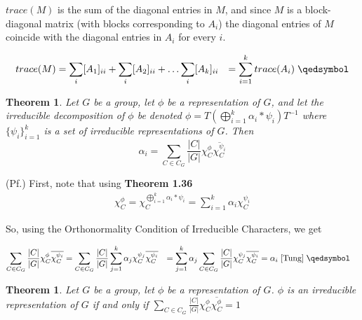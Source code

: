 \documentclass[10pt]{ucthesis}
\newtheorem{theorem}[definition]{Theorem}
\begin{document}
$trace(M)$ is the sum of the diagonal entries in $M$, and since $M$ is a block-diagonal matrix (with blocks corresponding to $A_i$) the diagonal entries of $M$ coincide with the diagonal entries in $A_i$ for every $i$.

\begin{equation}
	\begin{aligned}
		trace(M) &= \sum_i [A_1]_{ii} + \sum_i [A_2]_{ii} + \hdots \sum_i [A_k]_{ii} &= \sum_{i=1}^k trace(A_i) \hspace{1mm}\qedsymbol
	\end{aligned}
\end{equation}

\begin{theorem}
	Let $G$ be a group, let $\phi$ be a representation of $G$, and let the irreducible decomposition of $\phi$ be denoted $\phi = T \left( \bigoplus_{i=1}^k \alpha_i *\psi_i\right) T^{-1}$ where $\{\psi_i\}_{i=1}^k$ is a set of irreducible representations of $G$. Then $$\alpha_i = \sum_{C\in C_G} \frac{|C|}{|G|}\chi^\phi_C \overline{\chi^{\psi_i}_C}$$
\end{theorem}

\noindent (Pf.) First, note that using \textbf{Theorem 1.36}
\begin{equation}
	\begin{aligned}
		\chi^\phi_C = \chi^{ \bigoplus_{i=1}^k \alpha_i *\psi_i}_C = \sum_{i=1}^k \alpha_i \chi^{\psi_i}_C
	\end{aligned}
\end{equation}

So, using the Orthonormality Condition of Irreducible Characters, we get 

\begin{equation}
	\begin{aligned}
\sum_{C\in C_G} \frac{|C|}{|G|}\chi^\phi_C \overline{\chi^{\psi_i}_C} &= \sum_{C\in C_G} \frac{|C|}{|G|} \sum_{j=1}^k \alpha_j \chi^{\psi_j}_C \overline{\chi^{\psi_i}_C} &= \sum_{j=1}^k \alpha_j \sum_{C\in C_G} \frac{|C|}{|G|} \chi^{\psi_j}_C \overline{\chi^{\psi_i}_C}  &= \alpha_i \hspace{1mm} \cite{Tung} \hspace{1mm} \qedsymbol
	\end{aligned}
\end{equation}

\begin{theorem}
	Let $G$ be a group, let $\phi$ be a representation of $G$. $\phi$ is an irreducible representation of $G$ if and only if $\sum_{C\in C_G} \frac{|C|}{|G|}\chi^\phi_C \overline{\chi^\phi_C} = 1$
\end{theorem}
\end{document}
